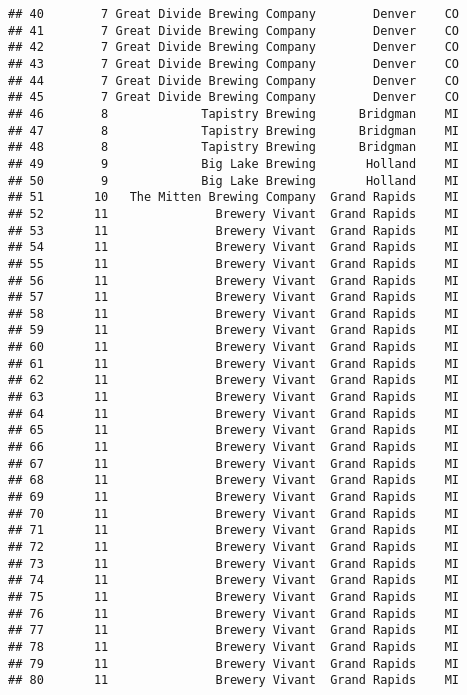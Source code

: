 \documentclass[
]{article}
\begin{document}
\begin{verbatim}
## 40        7 Great Divide Brewing Company        Denver    CO
## 41        7 Great Divide Brewing Company        Denver    CO
## 42        7 Great Divide Brewing Company        Denver    CO
## 43        7 Great Divide Brewing Company        Denver    CO
## 44        7 Great Divide Brewing Company        Denver    CO
## 45        7 Great Divide Brewing Company        Denver    CO
## 46        8             Tapistry Brewing      Bridgman    MI
## 47        8             Tapistry Brewing      Bridgman    MI
## 48        8             Tapistry Brewing      Bridgman    MI
## 49        9             Big Lake Brewing       Holland    MI
## 50        9             Big Lake Brewing       Holland    MI
## 51       10   The Mitten Brewing Company  Grand Rapids    MI
## 52       11               Brewery Vivant  Grand Rapids    MI
## 53       11               Brewery Vivant  Grand Rapids    MI
## 54       11               Brewery Vivant  Grand Rapids    MI
## 55       11               Brewery Vivant  Grand Rapids    MI
## 56       11               Brewery Vivant  Grand Rapids    MI
## 57       11               Brewery Vivant  Grand Rapids    MI
## 58       11               Brewery Vivant  Grand Rapids    MI
## 59       11               Brewery Vivant  Grand Rapids    MI
## 60       11               Brewery Vivant  Grand Rapids    MI
## 61       11               Brewery Vivant  Grand Rapids    MI
## 62       11               Brewery Vivant  Grand Rapids    MI
## 63       11               Brewery Vivant  Grand Rapids    MI
## 64       11               Brewery Vivant  Grand Rapids    MI
## 65       11               Brewery Vivant  Grand Rapids    MI
## 66       11               Brewery Vivant  Grand Rapids    MI
## 67       11               Brewery Vivant  Grand Rapids    MI
## 68       11               Brewery Vivant  Grand Rapids    MI
## 69       11               Brewery Vivant  Grand Rapids    MI
## 70       11               Brewery Vivant  Grand Rapids    MI
## 71       11               Brewery Vivant  Grand Rapids    MI
## 72       11               Brewery Vivant  Grand Rapids    MI
## 73       11               Brewery Vivant  Grand Rapids    MI
## 74       11               Brewery Vivant  Grand Rapids    MI
## 75       11               Brewery Vivant  Grand Rapids    MI
## 76       11               Brewery Vivant  Grand Rapids    MI
## 77       11               Brewery Vivant  Grand Rapids    MI
## 78       11               Brewery Vivant  Grand Rapids    MI
## 79       11               Brewery Vivant  Grand Rapids    MI
## 80       11               Brewery Vivant  Grand Rapids    MI

\end{verbatim}
\end{document}
